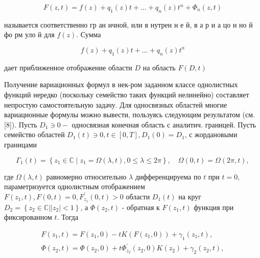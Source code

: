 \documentclass[10pt]{article}
\begin{document}
\[

F(z, t)=f(z)+q_{1}(z) t+\ldots+q_{n}(z) t^{n}+\Phi_{n}(z, t)

\]



называется соответственно гр ан ичной, или в нутрен н е й, в а р и а цо н но й фо рм уло й для $f(z)$. Сумма



\[

f(z)+q_{1}(z) t+\ldots+q_{n}(z) t^{n}

\]



дает приближенное отображение области $D$ на область $F(D, t)$



Получение вариационных формул в нек-ром заданном классе однолистных функций нередко (поскольку семейство таких функций нелинейно) составляет непростую самостоятельную задачу. Для односвязных областей многие вариационные формулы можно вывести, пользуясь следующим результатом (см. [8]). Пусть $D_{1} \ni 0-$ односвязная конечная область с аналитич. границей. Пусть семейство областей $D_{1}(t) \ni 0, t \in[0, T], D_{1}(0)=D_{1}$, с жордановыми границами



\[

\Gamma_{1}(t)=\left\{z_{1} \in \mathbb{C} \mid z_{1}=\Omega(\lambda, t), 0 \leqslant \lambda \leqslant 2 \pi\right\}, \quad \Omega(0, t)=\Omega(2 \pi, t),

\]



где $\Omega(\lambda, t)$ равномерно относительно $\lambda$ дифференцируема по $t$ при $t=0$, параметризуется однолистным отображением $F\left(z_{1}, t\right), F(0, t)=0, F_{z_{1}}^{\prime}(0, t)>0$ области $D_{1}(t)$ на круг $D_{2}=\left\{z_{2} \in \mathbb{C}|| z_{2} \mid<1\right\}$, а $\Phi\left(z_{2}, t\right)$ - обратная к $F\left(z_{1}, t\right)$ функция при фиксированном $t$. Тогда



\[

\begin{gathered}

F\left(z_{1}, t\right)=F\left(z_{1}, 0\right)-t K\left(F\left(z_{1}, 0\right)\right)+\gamma_{1}\left(z_{1}, t\right), \\

\Phi\left(z_{2}, t\right)=\Phi\left(z_{2}, 0\right)+t \Phi_{z_{2}}^{\prime}\left(z_{2}, 0\right) K\left(z_{2}\right)+\gamma_{2}\left(z_{2}, t\right),

\end{gathered}

\]
\end{document}
